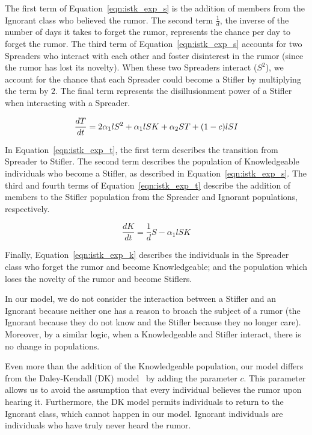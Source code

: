 \noindent The first term of Equation~\ref{eqn:istk_exp_s} is the addition of members from the Ignorant class who believed the rumor.
The second term $ \frac{1}{d} $, the inverse of the number of days it takes to forget the rumor, represents the chance per day to forget the rumor.
The third term of Equation~\ref{eqn:istk_exp_s} accounts for two Spreaders who interact with each other and foster disinterest in the rumor (since the rumor has lost its novelty).
When these two Spreaders interact ($ S^2 $), we account for the chance that each Spreader could become a Stifler by multiplying the term by $ 2 $.
The final term represents the disillusionment power of a Stifler when interacting with a Spreader.

\begin{equation}
\label{eqn:istk_exp_t} \frac{dT}{dt} = 2 \alpha_1l S^2 + \alpha_1l SK + \alpha_2 ST + (1-c)lSI \\
\end{equation}

\noindent In Equation~\ref{eqn:istk_exp_t}, the first term describes the transition from Spreader to Stifler.
The second term describes the population of Knowledgeable individuals who become a Stifler, as described in Equation~\ref{eqn:istk_exp_s}.
The third and fourth terms of Equation~\ref{eqn:istk_exp_t} describe the addition of members to the Stifler population from the Spreader and Ignorant populations, respectively.

\begin{equation}
\label{eqn:istk_exp_k} \frac{dK}{dt} = \frac{1}{d}S - \alpha_1l SK
\end{equation}

\noindent Finally, Equation~\ref{eqn:istk_exp_k} describes the individuals in the Spreader class who forget the rumor and become Knowledgeable; and the population which loses the novelty of the rumor and become Stiflers.

In our model, we do not consider the interaction between a Stifler and an Ignorant because neither one has a reason to broach the subject of a rumor (the Ignorant because they do not know and the Stifler because they no longer care).
Moreover, by a similar logic, when a Knowledgeable and Stifler interact, there is no change in populations.

Even more than the addition of the Knowledgeable population, our model differs from the Daley-Kendall (DK) model~\cite{daley-1965} by adding the parameter $ c $.
This parameter allows us to avoid the assumption that every individual believes the rumor upon hearing it.
Furthermore, the DK model permits individuals to return to the Ignorant class, which cannot happen in our model.
Ignorant individuals are individuals who have truly never heard the rumor.

